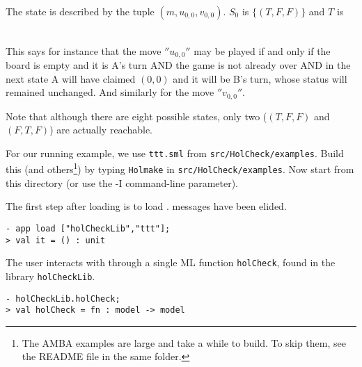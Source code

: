 The state is described by the tuple \( (m,u_{0,0},v_{0,0}) \). \(S_0\) is \( \{ (T,F,F) \} \) and \( T \) is

\begin{eqnarray*}
 [&(&''{u_{0,0}}'',(\lnot u_{0,0} \land \lnot v_{0,0} \land m) \land \lnot((\lnot m \land u_{0,0}) \lor (m \land v_{0,0}))\\
       &&\land (u_{0,0}' \land \lnot m' \land (v_{0,0}' = v_{0,0}))),\\
     &(&''{v_{0,0}}'',(\lnot v_{0,0} \land \lnot u_{0,0} \land \lnot m) \land \lnot((\lnot m \land u_{0,0}) \lor (m \land v_{0,0}))\\
        &&\land (v_{0,0}' \land m' \land (u_{0,0}' = u_{0,0})))]
\end{eqnarray*}

This says for instance that the move \(''{u_{0,0}}''\) may be played if and only if the board is empty and it is A's turn AND the game is not already over AND in the next state A will have claimed \((0,0)\) and it will be B's turn, whose status will remained unchanged. And similarly for the move \(''{v_{0,0}}''\).

Note that although there are eight possible states, only two (\((T,F,F)\) and \((F,T,F) \)) are actually reachable.

For our running example, we use \texttt{ttt.sml} from \texttt{src/HolCheck/examples}. Build this (and others\footnote{The AMBA examples are large and take a while to build. To skip them, see the README file in the same folder.}) by typing \texttt{Holmake} in \texttt{src/HolCheck/examples}. Now start \HOL{} from this directory (or use the -I command-line parameter).

The first step after loading \HOL{} is to load \hc{}. \HOL{} messages have been elided.

\setcounter{sessioncount}{0}

\begin{session}\begin{verbatim}
- app load ["holCheckLib","ttt"];
> val it = () : unit
\end{verbatim}\end{session}

The user interacts with \hc{} through a single ML function \texttt{holCheck}, found in the library \texttt{holCheckLib}.

\begin{session}\begin{verbatim}
- holCheckLib.holCheck;
> val holCheck = fn : model -> model
\end{verbatim}\end{session}

